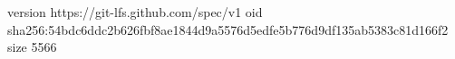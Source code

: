 version https://git-lfs.github.com/spec/v1
oid sha256:54bdc6ddc2b626fbf8ae1844d9a5576d5edfe5b776d9df135ab5383c81d166f2
size 5566
